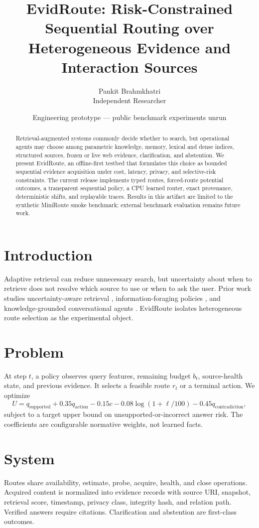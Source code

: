 \documentclass[11pt]{article}
\title{EvidRoute: Risk-Constrained Sequential Routing over\\
Heterogeneous Evidence and Interaction Sources}
\author{Pankit Brahmkhatri\\Independent Researcher}
\date{Engineering prototype --- public benchmark experiments unrun}
\begin{document}
\maketitle

\begin{abstract}
Retrieval-augmented systems commonly decide whether to search, but operational agents may
choose among parametric knowledge, memory, lexical and dense indices, structured sources,
frozen or live web evidence, clarification, and abstention. We present EvidRoute, an
offline-first testbed that formulates this choice as bounded sequential evidence acquisition
under cost, latency, privacy, and selective-risk constraints. The current release implements
typed routes, forced-route potential outcomes, a transparent sequential policy, a CPU learned
router, exact provenance, deterministic shifts, and replayable traces. Results in this artifact
are limited to the synthetic MiniRoute smoke benchmark; external benchmark evaluation remains
future work.
\end{abstract}

\section{Introduction}
Adaptive retrieval can reduce unnecessary search, but uncertainty about when to retrieve does
not resolve which source to use or when to ask the user. Prior work studies uncertainty-aware
retrieval \cite{moskvoretskii2025adaptive,wu2025search}, information-foraging policies
\cite{qian2025scent}, and knowledge-grounded conversational agents
\cite{shi2026tauknowledge}. EvidRoute isolates heterogeneous route selection as the experimental
object.

\section{Problem}
At step $t$, a policy observes query features, remaining budget $b_t$, source-health state, and
previous evidence. It selects a feasible route $r_t$ or a terminal action. We optimize
\[
U = q_{\mathrm{supported}} + 0.35 q_{\mathrm{action}}
    - 0.15 c - 0.08\log(1 + \ell/100) - 0.45 q_{\mathrm{contradiction}},
\]
subject to a target upper bound on unsupported-or-incorrect answer risk. The coefficients are
configurable normative weights, not learned facts.

\section{System}
Routes share availability, estimate, probe, acquire, health, and close operations. Acquired
content is normalized into evidence records with source URI, snapshot, retrieval score,
timestamp, privacy class, integrity hash, and relation path. Verified answers require citations.
Clarification and abstention are first-class outcomes.
\end{document}
